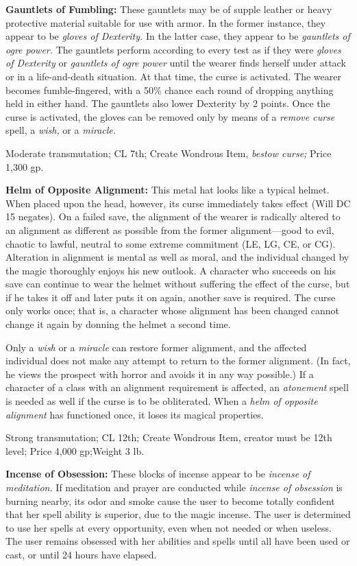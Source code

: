 \documentclass{article}
\begin{document}
\textbf{Gauntlets of Fumbling:} These gauntlets may be of supple leather or heavy 
protective material suitable for use with armor. In the former instance, they appear 
to be \textit{gloves of Dexterity. }In the latter case, they appear to be \textit{gauntlets 
of ogre power. }The gauntlets perform according to every test as if they were \textit{gloves 
of Dexterity }or \textit{gauntlets of ogre power }until the wearer finds herself 
under attack or in a life-and-death situation. At that time, the curse is activated. 
The wearer becomes fumble-fingered, with a 50\% chance each round of dropping anything 
held in either hand. The gauntlets also lower Dexterity by 2 points. Once the curse 
is activated, the gloves can be removed only by means of a \textit{remove curse 
}spell, a \textit{wish, }or a \textit{miracle.}

Moderate transmutation; CL 7th; Create Wondrous Item, \textit{bestow curse; }Price 
1,300 gp.

\textbf{Helm of Opposite Alignment:} This metal hat looks like a typical helmet. 
When placed upon the head, however, its curse immediately takes effect (Will DC 
15 negates). On a failed save, the alignment of the wearer is radically altered 
to an alignment as different as possible from the former alignment---good to evil, 
chaotic to lawful, neutral to some extreme commitment (LE, LG, CE, or CG). Alteration 
in alignment is mental as well as moral, and the individual changed by the magic 
thoroughly enjoys his new outlook. A character who succeeds on his save can continue 
to wear the helmet without suffering the effect of the curse, but if he takes it 
off and later puts it on again, another save is required. The curse only works 
once; that is, a character whose alignment has been changed cannot change it again 
by donning the helmet a second time.

Only a \textit{wish }or a \textit{miracle }can restore former alignment, and the 
affected individual does not make any attempt to return to the former alignment. 
(In fact, he views the prospect with horror and avoids it in any way possible.) 
If a character of a class with an alignment requirement is affected, an \textit{atonement 
}spell is needed as well if the curse is to be obliterated. When a \textit{helm 
of opposite alignment }has functioned once, it loses its magical properties.

Strong transmutation; CL 12th; Create Wondrous Item, creator must be 12th level; 
Price 4,000 gp;Weight 3 lb.

\textbf{Incense of Obsession:} These blocks of incense appear to be \textit{incense 
of meditation. }If meditation and prayer are conducted while \textit{incense of 
obsession }is burning nearby, its odor and smoke cause the user to become totally 
confident that her spell ability is superior, due to the magic incense. The user 
is determined to use her spells at every opportunity, even when not needed or when 
useless. The user remains obsessed with her abilities and spells until all have 
been used or cast, or until 24 hours have elapsed.
\end{document}
